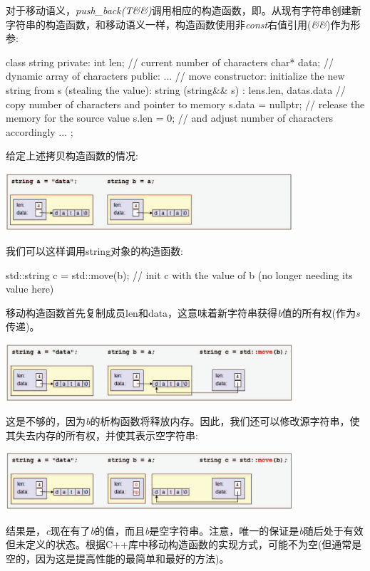 对于移动语义，\textit{push_back(T\&\&)}调用相应的构造函数，即。从现有字符串创建新字符串的构造函数，和移动语义一样，构造函数使用非\textit{const}右值引用(\textit{\&\&})作为形参:

\begin{cppcode}
class string {
	private:
	int len; // current number of characters
	char* data; // dynamic array of characters
	public:
	...
	// move constructor: initialize the new string from s (stealing the value):
	string (string&& s)
	: len{s.len}, data{s.data} { // copy number of characters and pointer to memory
		s.data = nullptr; // release the memory for the source value
		s.len = 0; // and adjust number of characters accordingly
	}
	...
};
\end{cppcode}

给定上述拷贝构造函数的情况:

\begin{center}
	\includegraphics[width=0.8\textwidth]{part1/ch1/images/20}
\end{center}

我们可以这样调用string对象的构造函数:

\begin{cppcode}
std::string c = std::move(b); // init c with the value of b (no longer needing its value here)
\end{cppcode}

移动构造函数首先复制成员len和data，这意味着新字符串获得\textit{b}值的所有权(作为\textit{s}传递)。

\begin{center}
	\includegraphics[width=0.8\textwidth]{part1/ch1/images/21}
\end{center}

这是不够的，因为\textit{b}的析构函数将释放内存。因此，我们还可以修改源字符串，使其失去内存的所有权，并使其表示空字符串:

\begin{center}
	\includegraphics[width=0.8\textwidth]{part1/ch1/images/22}
\end{center}

结果是，\textit{c}现在有了\textit{b}的值，而且\textit{b}是空字符串。注意，唯一的保证是\textit{b}随后处于有效但未定义的状态。根据C++库中移动构造函数的实现方式，可能不为空(但通常是空的，因为这是提高性能的最简单和最好的方法)。


















